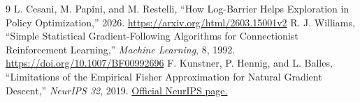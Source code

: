\documentclass[10pt,a4paper]{article}
\begin{document}
\begin{thebibliography}{9}
 L. Cesani, M. Papini, and M. Restelli,
``How Log-Barrier Helps Exploration in Policy Optimization,'' 2026.
\url{https://arxiv.org/html/2603.15001v2}
 R. J. Williams,
``Simple Statistical Gradient-Following Algorithms for Connectionist
Reinforcement Learning,'' \emph{Machine Learning}, 8, 1992.
\url{https://doi.org/10.1007/BF00992696}
 F. Kunstner, P. Hennig, and L. Balles,
``Limitations of the Empirical Fisher Approximation for Natural Gradient
Descent,'' \emph{NeurIPS 32}, 2019.
\href{https://proceedings.neurips.cc/paper/2019/hash/46a558d97954d0692411c861cf78ef79-Abstract.html}{Official NeurIPS page.}
\end{thebibliography}
\end{document}
